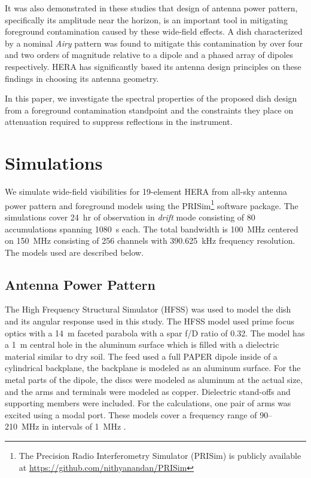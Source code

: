 \documentclass[preprint2,iop,numberedappendix,twocolappendix,appendixfloats]{emulateapj}
\begin{document}
It was also demonstrated in these studies that design of antenna power pattern, specifically its amplitude near the horizon, is an important tool in mitigating foreground contamination caused by these wide-field effects. A dish characterized by a nominal {\it Airy} pattern was found to mitigate this contamination by over four and two orders of magnitude relative to a dipole and a phased array of dipoles respectively. HERA has significantly based its antenna design principles on these findings in choosing its antenna geometry.

In this paper, we investigate the spectral properties of the proposed dish design from a foreground contamination standpoint and the constraints they place on attenuation required to suppress reflections in the instrument. 

\section{Simulations}\label{sec:sim}

We simulate wide-field visibilities for 19-element HERA from all-sky antenna power pattern and foreground models using the PRISim\footnote{The Precision Radio Interferometry Simulator (PRISim) is publicly available at \url{https://github.com/nithyanandan/PRISim}} software package. The simulations cover 24~hr of observation in {\it drift} mode consisting of 80 accumulations spanning 1080~s each. The total bandwidth is 100~MHz centered on 150~MHz consisting of 256 channels with 390.625~kHz frequency resolution. The models used are described below.

\subsection{Antenna Power Pattern}\label{sec:beam-model}

The High Frequency Structural Simulator (HFSS) was used to model the dish and its angular response used in this study. The HFSS model used prime focus optics with a 14~m faceted parabola with a spar f/D ratio of 0.32.  The model has a 1~m central hole in the aluminum surface which is filled with a dielectric material similar to dry soil. The feed used a full PAPER dipole inside of a cylindrical backplane, the backplane is modeled as an aluminum surface. For the metal parts of the dipole, the discs were modeled as aluminum at the actual size, and the arms and terminals were modeled as copper. Dielectric stand-offs and supporting members were included. For the calculations, one pair of arms was excited using a modal port. These models cover a frequency range of 90--210~MHz in intervals of 1~MHz \citep{deb16}. 
\end{document}
